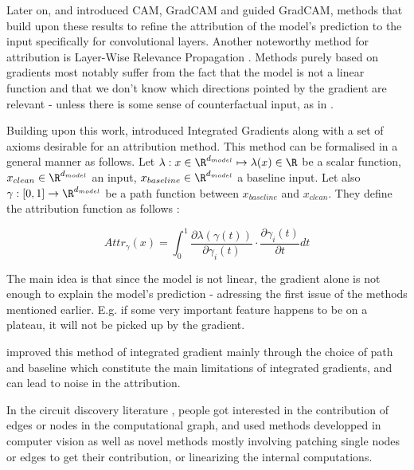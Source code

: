 \documentclass{article}
\begin{document}
Later on, \citet{zhou2016CAM} and \citet{selvaraju2017GradCAM} introduced CAM, GradCAM and guided GradCAM, methods that build upon these results to refine the attribution of the model's prediction to the input specifically for convolutional layers. Another noteworthy method for attribution is Layer-Wise Relevance Propagation \citep{montavon2019layerLRP}. Methods purely based on gradients most notably suffer from the fact that the model is not a linear function and that we don't know which directions pointed by the gradient are relevant - unless there is some sense of counterfactual input, as in \citep{syed2023attributionAtP}.

Building upon this work, \citet{sundararajan2017axiomaticIG} introduced Integrated Gradients along with a set of axioms desirable for an attribution method. This method can be formalised in a general manner as follows. Let $\lambda : x \in \R^{d_{model}} \mapsto \lambda(x) \in \R$ be a scalar function, $x_{clean} \in \R^{d_{model}}$ an input, $x_{baseline} \in \R^{d_{model}}$ a baseline input. Let also $\gamma : [0, 1] \rightarrow \R^{d_{model}}$ be a path function between $x_{baseline}$ and $x_{clean}$. They define the attribution function as follows :

$$ Attr_{\gamma}(x) = \int_{0}^{1} \frac{\partial \lambda(\gamma(t))}{\partial \gamma_i(t)} \cdot \frac{\partial \gamma_i(t)}{\partial t} dt $$

The main idea is that since the model is not linear, the gradient alone is not enough to explain the model's prediction - adressing the first issue of the methods mentioned earlier. E.g. if some very important feature happens to be on a plateau, it will not be picked up by the gradient.%
    
\citet{smilkov2017smoothgradIG, miglani2020investigatingIG, kapishnikov2021guidedGIG} improved this method of integrated gradient mainly through the choice of path and baseline which constitute the main limitations of integrated gradients, and can lead to noise in the attribution. %

In the circuit discovery literature \citep{olah2020zoomCircuits}, people got interested in the contribution of edges or nodes in the computational graph, and used methods developped in computer vision \citep{syed2023attributionCircuits, marks2024sparseCircuits} as well as novel methods \citep{wang2022interpretabilityCircuits, conmy2023automatedACDCCircuits, ferrando2024informationCircuits, he2024dictionaryCircuits} mostly involving patching single nodes or edges to get their contribution, or linearizing the internal computations.
\end{document}
